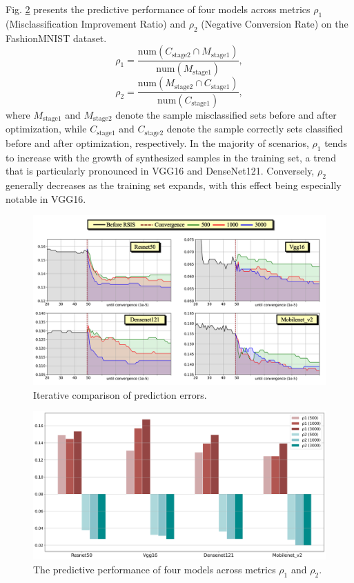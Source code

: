 \documentclass[final,3p,times]{elsarticle}
\begin{document}
Fig. \ref{Fig9} presents the predictive performance of four 
models across metrics $\rho_1$ (Misclassification Improvement 
Ratio) and $\rho_2$ (Negative Conversion Rate) on the 
FashionMNIST dataset.
\begin{equation}
\label{eq21}
\rho_1=\dfrac{\text{num}(C_{\text{stage2}}\cap  
M_{\text{stage1}})}{\text{num}(M_{\text{stage1}})},
\end{equation}
\begin{equation}
\label{eq22}
\rho_2=\dfrac{\text{num}(M_{\text{stage2}}\cap C_{\text{stage1}})}
{\text{num}(C_{\text{stage1}})},
\end{equation}
where $M_{\text{stage1}}$ and $M_{\text{stage2}}$ denote the 
sample misclassified sets before and after optimization, while 
$C_{\text{stage1}}$ and $C_{\text{stage2}}$ denote the sample 
correctly sets classified before and after optimization, 
respectively.  In the majority of scenarios, $\rho_1$ tends to 
increase with the growth of synthesized samples in the training 
set, a trend that is particularly pronounced in VGG16 and 
DenseNet121. Conversely, $\rho_2$ generally decreases as the 
training set expands, with this effect being especially notable 
in VGG16. 

\begin{figure}[h!]
  \centering
  \includegraphics[scale=0.32]{Fig8.png}
  \caption{Iterative comparison of prediction errors.}
  \label{Fig8}
\end{figure}

\begin{figure}[h!]
  \centering
  \includegraphics[scale=0.3]{Fig9.png}
  \caption{The predictive performance of four models across metrics $\rho_1$ and $\rho_2$.}
  \label{Fig9}
\end{figure}
\end{document}
